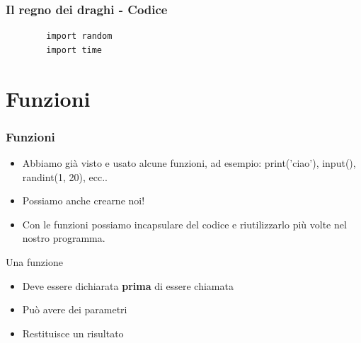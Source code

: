 \documentclass{beamer}
\begin{document}
\begin{frame}[fragile]
\frametitle{Il regno dei draghi - Codice}

    \begin{lstlisting}
        import random
        import time
    \end{lstlisting}

\end{frame}

\section{Funzioni}

\begin{frame}[fragile]
\frametitle{Funzioni}
    \begin{block}{}
        \begin{itemize}
            \item Abbiamo già visto e usato alcune funzioni, ad esempio: print('ciao'), input(), randint(1, 20), ecc..
            \item Possiamo anche crearne noi!
            \item Con le funzioni possiamo incapsulare del codice e riutilizzarlo più volte nel nostro programma.
        \end{itemize}
    \end{block}
    
    \begin{block}{Una funzione}
        \begin{itemize}
            \item Deve essere dichiarata \textbf{prima} di essere chiamata
            \item Può avere dei parametri
            \item Restituisce un risultato
        \end{itemize}
    \end{block}
\end{frame}
\end{document}
